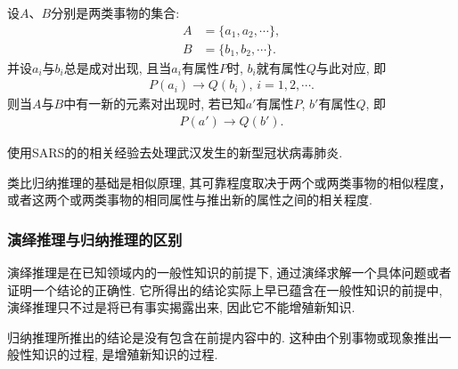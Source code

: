 设$A$、$B$分别是两类事物的集合:
\begin{align*}
  A&=\{a_1,a_2,\cdots\},\\
  B&=\{b_1,b_2,\cdots\}.
\end{align*}
并设$a_i$与$b_i$总是成对出现, 且当$a_i$有属性$P$时, $b_i$就有属性$Q$与此对应, 即
\begin{align*}
  P(a_i)\rightarrow Q(b_i),\,i=1,2,\cdots.
\end{align*}
     则当$A$与$B$中有一新的元素对出现时, 若已知$a'$有属性$P$, $b'$有属性$Q$, 即
\begin{align*}
  P(a')\rightarrow Q(b').
\end{align*}
\begin{example}
  使用SARS的的相关经验去处理武汉发生的新型冠状病毒肺炎.
\end{example}
\begin{remark}
类比归纳推理的基础是相似原理, 其可靠程度取决于两个或两类事物的相似程度，或者这两个或两类事物的相同属性与推出新的属性之间的相关程度.
\end{remark}
\subsubsection{演绎推理与归纳推理的区别}
演绎推理是在已知领域内的一般性知识的前提下, 通过演绎求解一个具体问题或者证明一个结论的正确性. 它所得出的结论实际上早已蕴含在一般性知识的前提中, 演绎推理只不过是将已有事实揭露出来, 因此它不能增殖新知识.

归纳推理所推出的结论是没有包含在前提内容中的. 这种由个别事物或现象推出一般性知识的过程, 是增殖新知识的过程.

